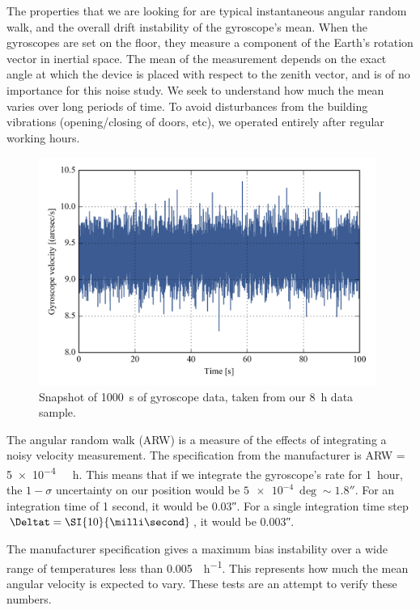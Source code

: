The properties that we are looking for are typical instantaneous angular random walk, and the overall drift instability of the gyroscope's mean. When the gyroscopes are set on the floor, they measure a component of the Earth's rotation vector in inertial space. The mean of the measurement depends on the exact angle at which the device is placed with respect to the zenith vector, and is of no importance for this noise study. We seek to understand how much the mean varies over long periods of time. To avoid disturbances from the building vibrations (opening/closing of doors, etc), we operated entirely after regular working hours.

\begin{figure}[!ht]
		\centering
		\includegraphics[width=0.98\textwidth]{Figures/snapshot_11005.png} 
		\caption[\SI{1000}{\second} of gyroscope data]{Snapshot of \SI{1000}{\second} of gyroscope data, taken from our \SI{8}{\hour} data sample.}
		\label{fig:snapshot11005}
\end{figure}


The angular random walk (ARW) is a measure of the effects of integrating a noisy velocity measurement. The specification from the manufacturer is ARW = \SI{5e-4}{\deg{}\hour}. This means that if we integrate the gyroscope's rate for 1~hour, the $1-\sigma$ uncertainty on our position would be 
$\SI{5e-4}{\deg}\sim\ang{;;1.8}$. For an integration time of 1 second, it would be \ang{;;0.03}. For a single integration time step $\Deltat = \SI{10}{\milli\second}$, it would be \ang{;;0.003}. 

The manufacturer specification gives a maximum bias instability over a wide range of temperatures less than \SI{0.005}{\deg\per\hour}. This represents how much the mean angular velocity is expected to vary. These tests are an attempt to verify these numbers.


